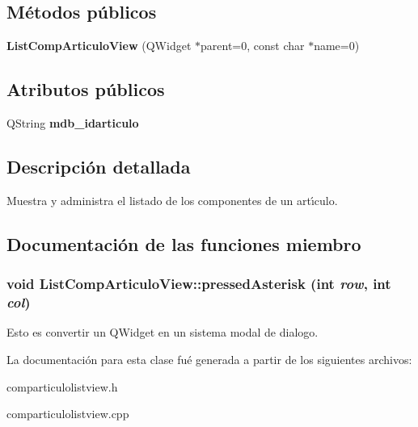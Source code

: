 \subsection*{M\'{e}todos p\'{u}blicos}
\begin{CompactItemize}
\item 
{\bf List\-Comp\-Articulo\-View} (QWidget $\ast$parent=0, const char $\ast$name=0)\label{classListCompArticuloView_a0}

\end{CompactItemize}
\subsection*{Atributos p\'{u}blicos}
\begin{CompactItemize}
\item 
QString {\bf mdb\_\-idarticulo}\label{classListCompArticuloView_o0}

\end{CompactItemize}


\subsection{Descripci\'{o}n detallada}
Muestra y administra el listado de los componentes de un art\'{\i}culo. 



\subsection{Documentaci\'{o}n de las funciones miembro}
\subsubsection{\setlength{\rightskip}{0pt plus 5cm}void List\-Comp\-Articulo\-View::pressed\-Asterisk (int {\em row}, int {\em col})\hspace{0.3cm}{\tt  [virtual, slot]}}\label{classListCompArticuloView_i2}


Esto es convertir un QWidget en un sistema modal de dialogo. 

La documentaci\'{o}n para esta clase fu\'{e} generada a partir de los siguientes archivos:\begin{CompactItemize}
\item 
comparticulolistview.h\item 
comparticulolistview.cpp\end{CompactItemize}
